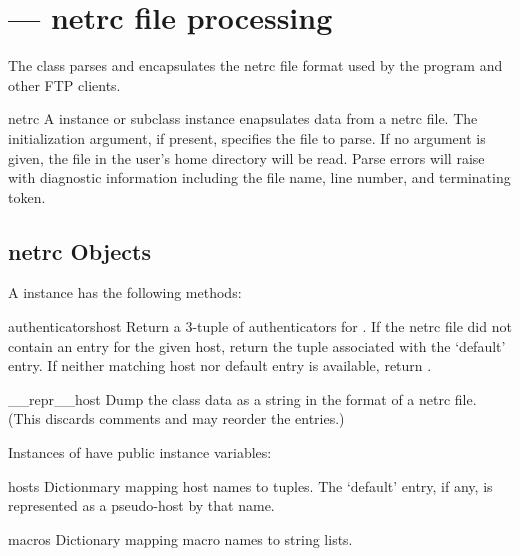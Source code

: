 
\section{ ---
         netrc file processing}




The  class parses and encapsulates the netrc file format
used by the \UNIX{}  program and other FTP clients.

\begin{classdesc}{netrc}{}
A  instance or subclass instance enapsulates data from 
a netrc file.  The initialization argument, if present, specifies the
file to parse.  If no argument is given, the file  in the
user's home directory will be read.  Parse errors will raise
 with diagnostic information including the file 
name, line number, and terminating token.
\end{classdesc}

\subsection{netrc Objects \label{netrc-objects}}

A  instance has the following methods:

\begin{methoddesc}{authenticators}{host}
Return a 3-tuple 
of authenticators for .  If the netrc file did not
contain an entry for the given host, return the tuple associated with
the `default' entry.  If neither matching host nor default entry is
available, return .
\end{methoddesc}

\begin{methoddesc}{__repr__}{host}
Dump the class data as a string in the format of a netrc file.
(This discards comments and may reorder the entries.)
\end{methoddesc}

Instances of  have public instance variables:

\begin{memberdesc}{hosts}
Dictionmary mapping host names to  tuples.  The `default' entry, if any, is represented
as a pseudo-host by that name.
\end{memberdesc}

\begin{memberdesc}{macros}
Dictionary mapping macro names to string lists.
\end{memberdesc}
